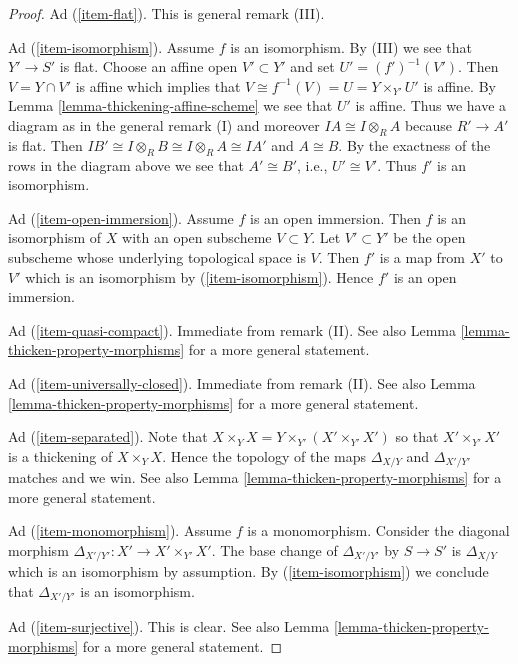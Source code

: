 \begin{proof}
\medskip\noindent
Ad (\ref{item-flat}). This is general remark (III).

\medskip\noindent
Ad (\ref{item-isomorphism}). Assume $f$ is an isomorphism.
By (III) we see that $Y' \to S'$ is flat. Choose an
affine open $V' \subset Y'$ and set $U' = (f')^{-1}(V')$. Then
$V = Y \cap V'$ is affine which implies that
$V \cong f^{-1}(V) = U = Y \times_{Y'} U'$ is affine. By
Lemma \ref{lemma-thickening-affine-scheme}
we see that $U'$ is affine. Thus we have a diagram as in the
general remark (I) and moreover $IA \cong I \otimes_R A$ because
$R' \to A'$ is flat. Then
$IB' \cong I \otimes_R B \cong I \otimes_R A \cong IA'$
and $A \cong B$. By the exactness of the rows
in the diagram above we see that $A' \cong B'$,
i.e., $U' \cong V'$. Thus $f'$ is an isomorphism.

\medskip\noindent
Ad (\ref{item-open-immersion}). Assume $f$ is an open immersion.
Then $f$ is an isomorphism of $X$ with an open subscheme $V \subset Y$.
Let $V' \subset Y'$ be the open subscheme whose underlying topological
space is $V$. Then $f'$ is a map from $X'$ to $V'$ which is an isomorphism by
(\ref{item-isomorphism}). Hence $f'$ is an open immersion.

\medskip\noindent
Ad (\ref{item-quasi-compact}). Immediate from remark (II). See also
Lemma \ref{lemma-thicken-property-morphisms} for a more general statement.

\medskip\noindent
Ad (\ref{item-universally-closed}). Immediate from remark (II). See also
Lemma \ref{lemma-thicken-property-morphisms} for a more general statement.

\medskip\noindent
Ad (\ref{item-separated}). Note that
$X \times_Y X = Y \times_{Y'} (X' \times_{Y'} X')$ so that
$X' \times_{Y'} X'$ is a thickening of $X \times_Y X$.
Hence the topology of the maps $\Delta_{X/Y}$ and $\Delta_{X'/Y'}$
matches and we win. See also
Lemma \ref{lemma-thicken-property-morphisms} for a more general statement.

\medskip\noindent
Ad (\ref{item-monomorphism}). Assume $f$ is a monomorphism.
Consider the diagonal morphism $\Delta_{X'/Y'} : X' \to X' \times_{Y'} X'$.
The base change of $\Delta_{X'/Y'}$ by $S \to S'$ is $\Delta_{X/Y}$
which is an isomorphism by assumption. By (\ref{item-isomorphism})
we conclude that $\Delta_{X'/Y'}$ is an isomorphism.

\medskip\noindent
Ad (\ref{item-surjective}). This is clear. See also
Lemma \ref{lemma-thicken-property-morphisms} for a more general statement.


\end{proof}
